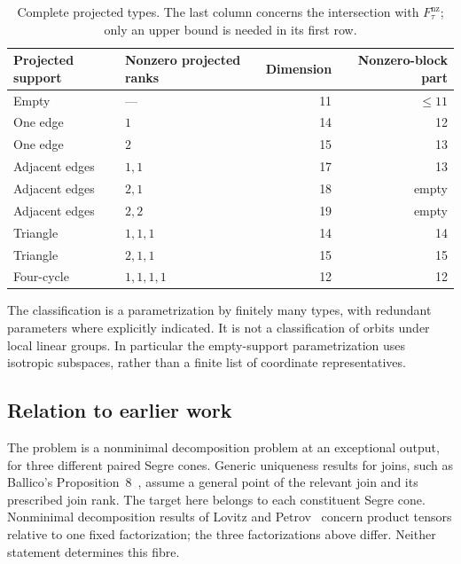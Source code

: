 \documentclass[11pt,letterpaper]{article}
\newcommand{\Fact}{F_\tau^{\mathrm{nz}}}
\theoremstyle{definition}
\begin{document}
\begin{table}[ht]
\centering
\begin{tabular}{@{}llrr@{}}
\toprule
Projected support & Nonzero projected ranks & Dimension & Nonzero-block part\\
\midrule
Empty & --- & 11 & \(\le11\)\\
One edge & \(1\) & 14 & 12\\
One edge & \(2\) & 15 & 13\\
Adjacent edges & \(1,1\) & 17 & 13\\
Adjacent edges & \(2,1\) & 18 & empty\\
Adjacent edges & \(2,2\) & 19 & empty\\
Triangle & \(1,1,1\) & 14 & 14\\
Triangle & \(2,1,1\) & 15 & 15\\
Four-cycle & \(1,1,1,1\) & 12 & 12\\
\bottomrule
\end{tabular}
\caption{Complete projected types. The last column concerns the intersection
with \(\Fact\); only an upper bound is needed in its first row.}
\label{main:table}
\end{table}

The classification is a parametrization by finitely many types, with
redundant parameters where explicitly indicated. It is not a classification
of orbits under local linear groups. In particular the empty-support
parametrization uses isotropic subspaces, rather than a finite list of
coordinate representatives.

\subsection*{Relation to earlier work}
The problem is a nonminimal decomposition problem at an exceptional output,
for three different paired Segre cones.
Generic uniqueness results for joins, such as
Ballico's Proposition~8~\cite{ballico}, assume a general point of the relevant
join and its prescribed join rank. The target here belongs to each
constituent Segre cone. Nonminimal decomposition results of
Lovitz and Petrov~\cite[Section~6.2]{lovitzpetrov} concern product tensors
relative to one fixed factorization; the three factorizations above differ.
Neither statement determines this fibre.
\end{document}
